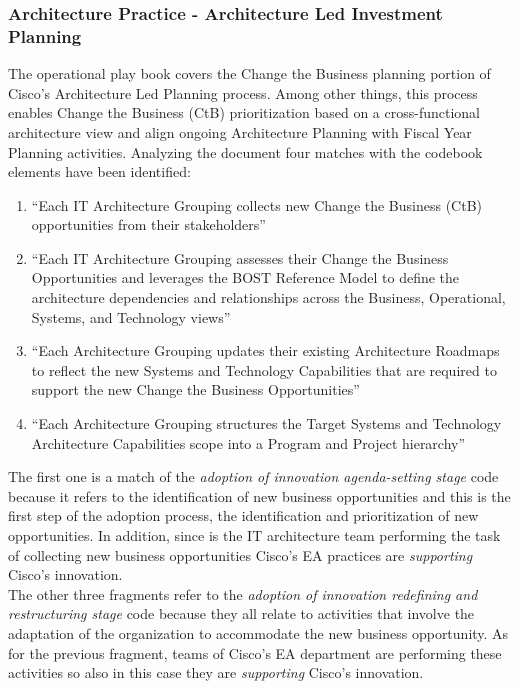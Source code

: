 \subsubsection*{Architecture Practice - Architecture Led Investment Planning}
The operational play book covers the Change the Business planning portion of Cisco's Architecture Led Planning process. Among other things, this process enables Change the Business (CtB) prioritization based on a cross-functional architecture view and align ongoing Architecture Planning with Fiscal Year Planning activities.
Analyzing the document \citep{architecturePractice} four matches with the codebook elements have been identified:
\begin{enumerate}
\item ``Each IT Architecture Grouping collects new Change the Business (CtB) opportunities from their stakeholders''
\item ``Each IT Architecture Grouping assesses their Change the Business Opportunities and leverages the BOST Reference Model to define the architecture dependencies and relationships across the Business, Operational, Systems, and Technology views'' 
\item ``Each Architecture Grouping updates their existing Architecture Roadmaps to reflect the new Systems and Technology Capabilities that are required to support the new Change the Business Opportunities''
\item ``Each Architecture Grouping structures the Target Systems and Technology Architecture Capabilities scope into a Program and Project hierarchy''
\end{enumerate}

The first one is a match of the \textit{adoption of innovation agenda-setting stage} code because it refers to the identification of new business opportunities and this is the first step of the adoption process, the identification and prioritization of new opportunities. In addition, since is the IT architecture team performing the task of collecting new business opportunities Cisco's EA practices are \textit{supporting} Cisco's innovation. \\
The other three fragments refer to the \textit{adoption of innovation redefining and restructuring stage} code because they all relate to activities that involve the adaptation of the organization to accommodate the new business opportunity. As for the previous fragment, teams of Cisco's EA department are performing these activities so also in this case they are \textit{supporting} Cisco's innovation.

